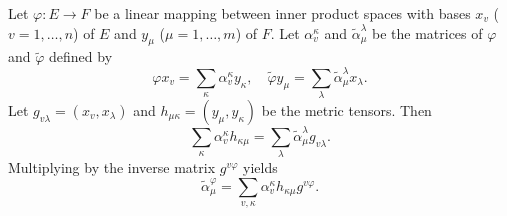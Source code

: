 Let $\varphi: E \rightarrow F$ be a linear mapping between inner product spaces with bases $x_v$ ($v = 1, \dots, n$) of $E$ and $y_\mu$ ($\mu = 1, \dots, m$) of $F$. Let $\alpha_v^\kappa$ and $\tilde{\alpha}_\mu^\lambda$ be the matrices of $\varphi$ and $\tilde{\varphi}$ defined by
$$\varphi x_v = \sum_\kappa \alpha_v^\kappa y_\kappa, \quad \tilde{\varphi} y_\mu = \sum_\lambda \tilde{\alpha}_\mu^\lambda x_\lambda.$$
Let $g_{v\lambda} = (x_v, x_\lambda)$ and $h_{\mu\kappa} = (y_\mu, y_\kappa)$ be the metric tensors. Then
$$\sum_\kappa \alpha_v^\kappa h_{\kappa\mu} = \sum_\lambda \tilde{\alpha}_\mu^\lambda g_{v\lambda}.$$
Multiplying by the inverse matrix $g^{v\varphi}$ yields
$$\tilde{\alpha}_\mu^\varphi = \sum_{v,\kappa} \alpha_v^\kappa h_{\kappa\mu} g^{v\varphi}.$$
